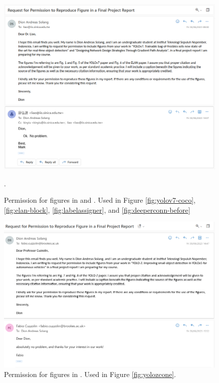 \chapter{}
\label{appendix:license}

\begin{figure}[!h]
  \centering
  \includegraphics[width=\textwidth]{figures/permission-yolov7.png}
  \caption*{Permission  for figures in \textcite{yolov7} and \textcite{elan}. Used in Figure \ref{fig:yolov7-coco}, \ref{fig:elan-block}, \ref{fig:labelassigner}, and \ref{fig:deeperconn-before}}.
\end{figure}

\begin{figure}[!h]
  \centering
  \includegraphics[width=\textwidth]{figures/permission-yoloz.png}
  \caption*{Permission  for figures in \textcite{yoloz}. Used in Figure \ref{fig:yolozcone}.}
\end{figure}
